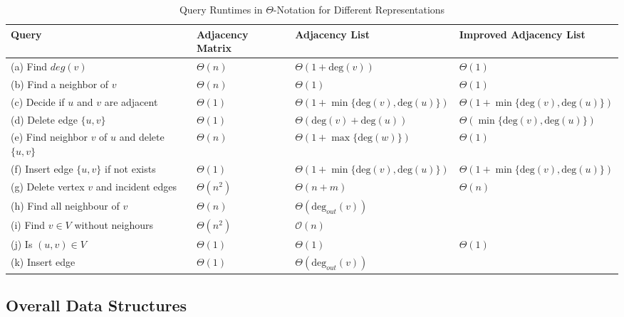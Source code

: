 \documentclass[a4paper]{article}
\begin{document}
\begin{table}[h]
    \centering
    \begin{tabular}{p{5cm}|p{1.8cm}|p{4.5cm}|p{4.5cm}}
        \toprule
        \textbf{Query} & \textbf{Adjacency Matrix} & \textbf{Adjacency List} & \textbf{Improved Adjacency List} \\
        \midrule
        (a) Find $deg(v)$ & $\Theta(n)$ & $\Theta(1 + \text{deg}(v))$ & $\Theta(1)$ \\
        (b) Find a neighbor of $v$ & $\Theta(n)$ & $\Theta(1)$ & $\Theta(1)$ \\
        (c) Decide if $u$ and $v$ are adjacent & $\Theta(1)$ & $\Theta(1 + \min\{\text{deg}(v), \text{deg}(u)\})$ & $\Theta(1 + \min\{\text{deg}(v), \text{deg}(u)\})$ \\
        (d) Delete edge $\{u, v\}$ & $\Theta(1)$ & $\Theta(\text{deg}(v) + \text{deg}(u))$ & $\Theta(\min\{\text{deg}(v), \text{deg}(u)\})$ \\
        (e) Find neighbor $v$ of $u$ and delete $\{u, v\}$ & $\Theta(n)$ & $\Theta(1 + \max \{\text{deg}(w)\})$ & $\Theta(1)$ \\
        (f) Insert edge $\{u, v\}$ if not exists & $\Theta(1)$ & $\Theta(1 + \min\{\text{deg}(v), \text{deg}(u)\})$ & $\Theta(1 + \min\{\text{deg}(v), \text{deg}(u)\})$ \\
        (g) Delete vertex $v$ and incident edges & $\Theta(n^2)$ & $\Theta(n + m)$ & $\Theta(n)$ \\
        (h) Find all neighbour of $v$  & $\Theta(n)$ & $\Theta(\text{deg}_{out}(v))$ &  \\
        (i) Find $v \in V$ without neighours & $\Theta(n^2)$ & $\mathcal{O}(n)$ &  \\
        (j) Is $(u,v) \in V$  & $\Theta(1)$ & $\Theta(1)$ & $\Theta(1)$ \\
        (k) Insert edge & $\Theta(1)$ & $\Theta(\text{deg}_{out}(v))$ & \\

        \bottomrule


        
    \end{tabular}
    \caption{Query Runtimes in $\Theta$-Notation for Different Representations}
    \label{tab:runtimes}
\end{table}

\newpage
    
\subsection{Overall Data Structures}
\end{document}
